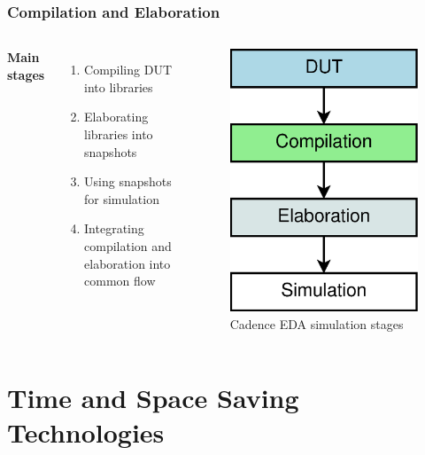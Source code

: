 \documentclass{beamer}
\begin{document}
\begin{frame}
  \frametitle{Compilation and Elaboration}
  \begin{columns}[c] %

    \textbf{Main stages}
    \begin{enumerate}
    \item Compiling DUT into libraries
    \item Elaborating libraries into snapshots
    \item Using snapshots for simulation
    \item Integrating compilation and elaboration into common flow
    \end{enumerate}

    \begin{figure}
      \centering
      \includegraphics[width=0.6\linewidth]{simulation_stages}
      \caption{Cadence EDA simulation stages}
    \end{figure}

  \end{columns}
\end{frame}

\section{Time and Space Saving Technologies}
\end{document}
